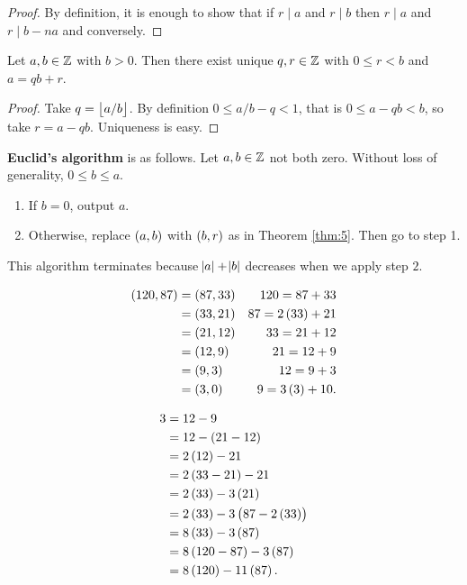 \begin{proof}
By definition, it is enough to show that if $ r \mid a $ and $ r \mid b $ then $ r \mid a $ and $ r \mid b - na $ and conversely.
\end{proof}

\begin{theorem}
\label{thm:5}
Let $ a, b \in \mathbb{Z} $ with $ b > 0 $. Then there exist unique $ q, r \in \mathbb{Z} $ with $ 0 \le r < b $ and $ a = qb + r $.
\end{theorem}

\begin{proof}
Take $ q = \left\lfloor a / b \right\rfloor $. By definition $ 0 \le a / b - q < 1 $, that is $ 0 \le a - qb < b $, so take $ r = a - qb $. Uniqueness is easy.
\end{proof}

\textbf{Euclid's algorithm} is as follows. Let $ a, b \in \mathbb{Z} $ not both zero. Without loss of generality, $ 0 \le b \le a $.
\begin{enumerate}[leftmargin=0.5in, label=Step \arabic*.]
\item If $ b = 0 $, output $ a $.
\item Otherwise, replace $ \br{a, b} $ with $ \br{b, r} $ as in Theorem \ref{thm:5}. Then go to step 1.
\end{enumerate}
This algorithm terminates because $ \abs{a} + \abs{b} $ decreases when we apply step $ 2 $.

\begin{example*}
\hfill

\begin{minipage}{0.5\textwidth}
\begin{align*}
\br{120, 87}
& = \br{87, 33} & 120 = 87 + 33 \\
& = \br{33, 21} & 87 = 2\br{33} + 21 \\
& = \br{21, 12} & 33 = 21 + 12 \\
& = \br{12, 9} & 21 = 12 + 9 \\
& = \br{9, 3} & 12 = 9 + 3 \\
& = \br{3, 0} & 9 = 3\br{3} + 10.
\end{align*}
\end{minipage}
\begin{minipage}{0.4\textwidth}
\begin{align*}
3
& = 12 - 9 \\
& = 12 - \br{21 - 12} \\
& = 2\br{12} - 21 \\
& = 2\br{33 - 21} - 21 \\
& = 2\br{33} - 3\br{21} \\
& = 2\br{33} - 3\br{87 - 2\br{33}} \\
& = 8\br{33} - 3\br{87} \\
& = 8\br{120 - 87} - 3\br{87} \\
& = 8\br{120} - 11\br{87}.
\end{align*}
\end{minipage}
\end{example*}

